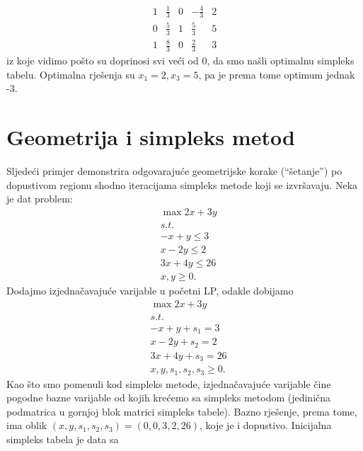 \documentclass[a4paper, utf8, 11pt, colorlinks]{book}
\begin{document}
$$ \begin{array}{cccc|c}
       1   & \frac{1}{3}       & 0             &   -\frac{4}{3}             &   2  \\
       0   & \frac{5}{3}       & 1	           & \frac{5}{3}                 &   5 \\ \hline
       1   & \frac{8}{3}       & 0             &  \frac{2}{3}               &   3  
   \end{array}
 $$
 iz koje vidimo pošto su doprinosi svi veći od 0, da smo našli optimalnu simpleks tabelu.  Optimalna rješenja su 
 $x_1=2, x_3=5$, pa je prema tome optimum jednak -3.
 
 \section{Geometrija i simpleks metod}
 
Sljedeći primjer demonstrira odgovarajuće geometrijske korake (``šetanje'') po dopustivom regionu shodno iteracijama simpleks metode koji se izvršavaju.   %
 Neka je dat problem:
 \begin{align*}
 	&\max 2x + 3y \\
 	& s.t. \\
 	& -x + y \leq 3 \\
 	& x - 2y \leq 2 \\
 	& 3x + 4y \leq 26 \\
 	& x, y \geq 0.
 \end{align*}
 Dodajmo izjednačavajuće varijable u početni LP, odakle dobijamo 
  \begin{align*}
 	&\max 2x + 3y \\
 	& s.t. \\
 	& -x + y + s_1 = 3 \\
 	& x - 2y + s_2 = 2 \\
 	& 3x + 4y + s_3 =  26 \\
 	& x, y, s_1, s_2, s_3 \geq 0.
 \end{align*}
Kao što smo pomenuli kod simpleks metode, 
izjednačavajuće varijable čine pogodne bazne varijable od kojih krećemo 
sa simpleks metodom (jedinična podmatrica u gornjoj blok matrici 
simpleks tabele). Bazno rješenje, prema tome, ima oblik 
$(x, y, s_1, s_2, s_3) = (0, 0, 3, 2, 26)$, koje je i dopustivo. Inicijalna simpleks 
tabela je data sa
\end{document}
